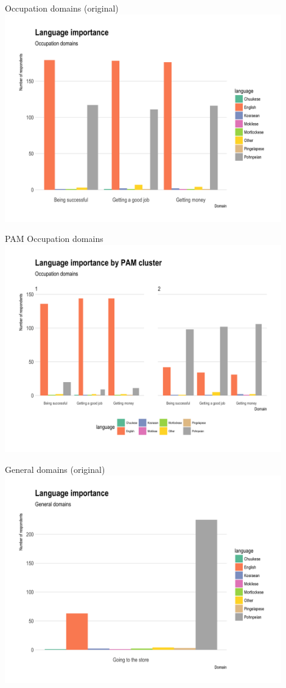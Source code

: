 \documentclass[10pt]{beamer}
\begin{document}
\begin{frame}{Occupation domains (original)}
\includegraphics[width=0.9\textwidth]{figures/occupationdomains.png}
\end{frame}

\begin{frame}{PAM Occupation domains}
\includegraphics[width=0.9\textwidth]{figures/PAMoccupationdomains.png}
\end{frame}

\begin{frame}{General domains (original)}
\includegraphics[width=0.9\textwidth]{figures/generaldomains.png}
\end{frame}
\end{document}
